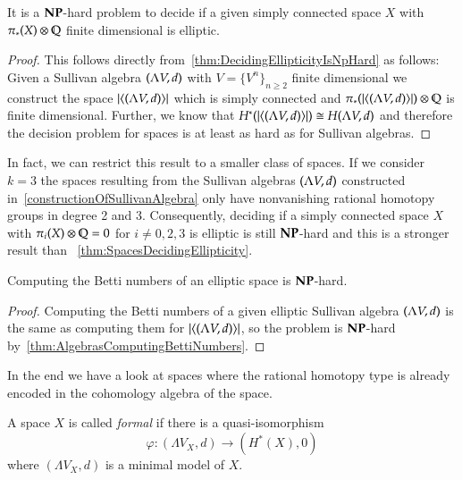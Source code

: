 \begin{Theorem}
\label{thm:SpacesDecidingEllipticity}
 It is a $\mathbf{NP}$-hard problem to decide if a given simply connected space $X$ with  $\pi_*(X) \otimes \mathbb{Q}$
 finite dimensional is elliptic.
\end{Theorem}

\begin{proof}
 This follows directly from~\ref{thm:DecidingEllipticityIsNpHard} as follows:
 Given a  Sullivan algebra $(\Lambda V,d)$ with $V = { \{ V^n \} }_{n \geq 2}$ finite dimensional we construct the 
 space $| \langle (\Lambda V,d) \rangle |$ which is simply connected and 
 $\pi_*(| \langle (\Lambda V,d) \rangle |) \otimes \mathbb{Q}$ is finite dimensional. Further, we know that 
 $H^*(| \langle (\Lambda V,d) \rangle |) \cong H (\Lambda V,d)$ and therefore the decision problem for 
 spaces is at least as hard as for Sullivan algebras.
\end{proof}

\begin{Remark}
 In fact, we can restrict this result to a smaller class of spaces. If we consider $k = 3$ the spaces resulting from
 the Sullivan algebras $(\Lambda V,d)$ constructed in~\ref{constructionOfSullivanAlgebra} only have nonvanishing rational
 homotopy groups in degree 2 and 3. Consequently, deciding if a simply connected space $X$ with
 $\pi_i(X) \otimes \mathbb{Q} = 0$ for $i \neq 0,2,3$ is elliptic is still $\mathbf{NP}$-hard and this is a stronger result than
~\ref{thm:SpacesDecidingEllipticity}.
\end{Remark}

\begin{Theorem}
 Computing the Betti numbers of an elliptic space is $\mathbf{NP}$-hard.
\end{Theorem}

\begin{proof}
 Computing the Betti numbers of a given elliptic Sullivan algebra $(\Lambda V,d)$ is the same as computing
 them for $ | \langle (\Lambda V,d) \rangle |$, so the problem is $\mathbf{NP}$-hard by~\ref{thm:AlgebrasComputingBettiNumbers}.
\end{proof}


In the end we have a look at spaces where the rational homotopy type is already encoded in the cohomology 
algebra of the space.

\begin{Definition}
 A space $X$ is called \emph{formal} if there is a quasi-isomorphism
 $$ \varphi \colon (\Lambda V_X , d) \to (H^*(X),0)$$
 where $(\Lambda V_X,d)$ is a minimal model of $X$.
\end{Definition}

